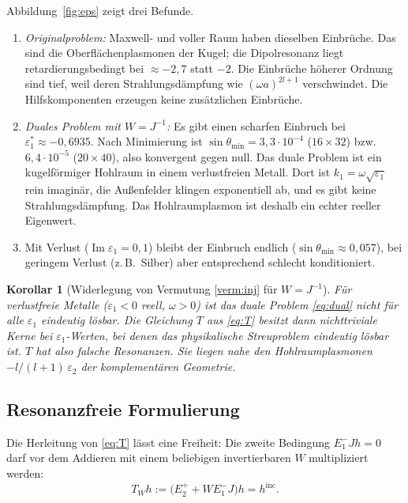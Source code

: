 \documentclass[11pt, a4paper]{article}
\theoremstyle{plain}
\newtheorem{korollar}[satz]{Korollar}
\theoremstyle{definition}
\newcommand{\status}[1]{\hfill{\small\sffamily[#1]}}
\begin{document}
Abbildung~\ref{fig:eps} zeigt drei Befunde.
\begin{enumerate}[leftmargin=*]
  \item \emph{Originalproblem:} Maxwell- und voller Raum haben dieselben
    Einbrüche. Das sind die Oberflächenplasmonen der Kugel; die Dipolresonanz liegt
    retardierungsbedingt bei $\approx-2{,}7$ statt $-2$. Die Einbrüche höherer
    Ordnung sind tief, weil deren Strahlungsdämpfung wie $(\omega a)^{2l+1}$
    verschwindet. Die Hilfskomponenten erzeugen keine zusätzlichen Einbrüche.
  \item \emph{Duales Problem mit $W=J^{-1}$:} Es gibt einen scharfen Einbruch bei
    $\varepsilon_1^*\approx-0{,}6935$. Nach Minimierung ist
    $\sin\theta_{\min} = 3{,}3\cdot10^{-4}$ ($16\times32$) bzw.\ $6{,}4\cdot10^{-5}$
    ($20\times40$), also konvergent gegen null. Das duale Problem ist ein
    kugelförmiger Hohlraum in einem verlustfreien Metall. Dort ist
    $k_1 = \omega\sqrt{\varepsilon_1}$ rein imaginär, die Außenfelder klingen
    exponentiell ab, und es gibt keine Strahlungsdämpfung. Das Hohlraumplasmon ist
    deshalb ein echter reeller Eigenwert.
  \item Mit Verlust ($\operatorname{Im}\varepsilon_1 = 0{,}1$) bleibt der Einbruch
    endlich ($\sin\theta_{\min}\approx0{,}057$), bei geringem Verlust
    (z.\,B.\ Silber) aber entsprechend schlecht konditioniert.
\end{enumerate}

\begin{korollar}[Widerlegung von Vermutung \ref{verm:inj} für $W=J^{-1}$]\label{kor:widerlegt}
\status{numerisch belegt}
Für verlustfreie Metalle ($\varepsilon_1<0$ reell, $\omega>0$) ist das duale
Problem \eqref{eq:dual} nicht für alle $\varepsilon_1$ eindeutig lösbar. Die
Gleichung $T$ aus \eqref{eq:T} besitzt dann nichttriviale Kerne bei
$\varepsilon_1$-Werten, bei denen das physikalische Streuproblem eindeutig lösbar
ist. $T$ hat also \emph{falsche Resonanzen}. Sie liegen nahe den
Hohlraumplasmonen $-l/(l+1)\,\varepsilon_2$ der komplementären Geometrie.
\end{korollar}

\subsection{Resonanzfreie Formulierung}

Die Herleitung von \eqref{eq:T} lässt eine Freiheit: Die zweite Bedingung
$E_1^-Jh=0$ darf vor dem Addieren mit einem beliebigen invertierbaren $W$
multipliziert werden:
\begin{equation}\label{eq:TW}
  T_Wh := \big(E_2^+ + W E_1^-J\big)h = h^{\mathrm{inc}} .
\end{equation}
\end{document}
